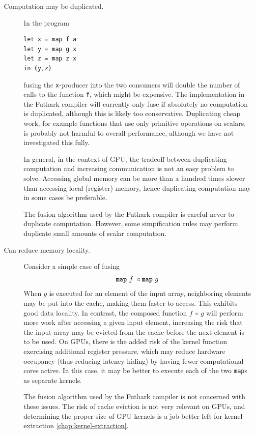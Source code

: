 \begin{description}
\item[Computation may be duplicated.]

In the program
\begin{lstlisting}
let x = map f a
let y = map g x
let z = map z x
in (y,z)
\end{lstlisting}
fusing the \texttt{x}-producer into the two consumers will double the
number of calls to the function \texttt{f}, which might be expensive.
The implementation in the Futhark compiler will currently only fuse if
absolutely no computation is duplicated, although this is likely too
conservative.  Duplicating cheap work, for example functions that use
only primitive operations on scalars, is probably not harmful to
overall performance, although we have not investigated this fully.

In general, in the context of GPU, the tradeoff between duplicating
computation and increasing communication is not an easy problem to
solve.  Accessing global memory can be more than a hundred times
slower than accessing local (register) memory, hence duplicating
computation may in some cases be preferable.

The fusion algorithm used by the Futhark compiler is careful never to
duplicate computation.  However, some simpification rules may perform
duplicate small amounts of scalar computation.

\item[Can reduce memory locality.]
  Consider a simple case of fusing
  \[
    \mbox{\texttt{\bfseries{map}}}~f~\circ \mbox{\texttt{\bfseries{map}}}~g
  \]
  When $g$ is executed for an element of the input array, neighboring
  elements may be put into the cache, making them faster to access.
  This exhibits good data locality.  In contrast, the composed
  function $f~\circ~g$ will perform more work after accessing a given
  input element, increasing the risk that the input array may be
  evicted from the cache before the next element is to be used.  On
  GPUs, there is the added risk of the kernel function exercising
  additional register pressure, which may reduce hardware occupancy
  (thus reducing latency hiding) by having fewer computational cores
  active.  In this case, it may be better to execute each of the two
  \texttt{map}s as separate kernels.

  The fusion algorithm used by the Futhark compiler is not concerned
  with these issues.  The risk of cache eviction is not very relevant
  on GPUs, and determining the proper size of GPU kernels is a job
  better left for kernel extraction \cref{chap:kernel-extraction}.
\end{description}


